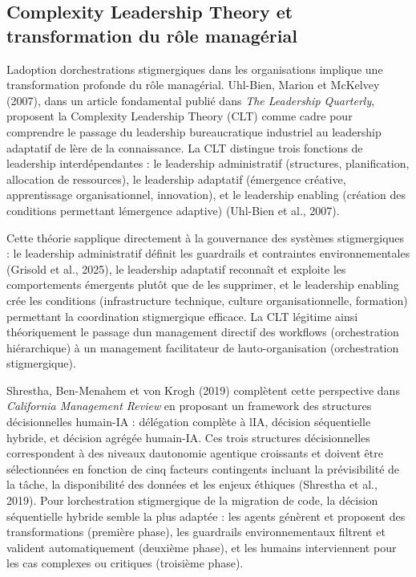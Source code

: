 \documentclass[12pt,a4paper]{article}
\begin{document}
\subsection{Complexity Leadership Theory et transformation du rôle
managérial}\label{complexity-leadership-theory-et-transformation-du-ruxf4le-managuxe9rial}

L\textquotesingle adoption d\textquotesingle orchestrations
stigmergiques dans les organisations implique une transformation
profonde du rôle managérial. Uhl-Bien, Marion et McKelvey (2007), dans
un article fondamental publié dans \emph{The Leadership Quarterly},
proposent la Complexity Leadership Theory (CLT) comme cadre pour
comprendre le passage du leadership bureaucratique industriel au
leadership adaptatif de l\textquotesingle ère de la connaissance. La CLT
distingue trois fonctions de leadership interdépendantes : le leadership
administratif (structures, planification, allocation de ressources), le
leadership adaptatif (émergence créative, apprentissage organisationnel,
innovation), et le leadership enabling (création des conditions
permettant l\textquotesingle émergence adaptive) (Uhl-Bien et al.,
2007).

Cette théorie s\textquotesingle applique directement à la gouvernance
des systèmes stigmergiques : le leadership administratif définit les
guardrails et contraintes environnementales (Grisold et al., 2025), le
leadership adaptatif reconnaît et exploite les comportements émergents
plutôt que de les supprimer, et le leadership enabling crée les
conditions (infrastructure technique, culture organisationnelle,
formation) permettant la coordination stigmergique efficace. La CLT
légitime ainsi théoriquement le passage d\textquotesingle un management
directif des workflows (orchestration hiérarchique) à un management
facilitateur de l\textquotesingle auto-organisation (orchestration
stigmergique).

Shrestha, Ben-Menahem et von Krogh (2019) complètent cette perspective
dans \emph{California Management Review} en proposant un framework des
structures décisionnelles humain-IA : délégation complète à
l\textquotesingle IA, décision séquentielle hybride, et décision agrégée
humain-IA. Ces trois structures décisionnelles correspondent à des
niveaux d\textquotesingle autonomie agentique croissants et doivent être
sélectionnées en fonction de cinq facteurs contingents incluant la
prévisibilité de la tâche, la disponibilité des données et les enjeux
éthiques (Shrestha et al., 2019). Pour l\textquotesingle orchestration
stigmergique de la migration de code, la décision séquentielle hybride
semble la plus adaptée : les agents génèrent et proposent des
transformations (première phase), les guardrails environnementaux
filtrent et valident automatiquement (deuxième phase), et les humains
interviennent pour les cas complexes ou critiques (troisième phase).
\end{document}
